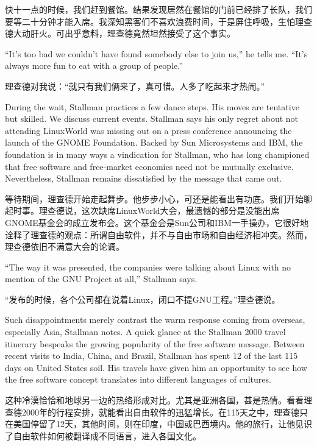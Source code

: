 \ifdefined\chs
快十一点的时候，我们赶到餐馆。结果发现居然在餐馆的门前已经排了长队，我们要等二十分钟才能入席。我深知黑客们不喜欢浪费时间，于是屏住呼吸，生怕理查德大动肝火。可出乎意料，理查德竟然坦然接受了这个事实。
\fi

\ifdefined\eng
``It's too bad we couldn't have found somebody else to join us,'' he tells me. ``It's always more fun to eat with a group of people.''
\fi

\ifdefined\chs
理查德对我说：“就只有我们俩来了，真可惜。人多了吃起来才热闹。”
\fi

\ifdefined\eng
During the wait, Stallman practices a few dance steps. His moves are tentative but skilled. We discuss current events. Stallman says his only regret about not attending LinuxWorld was missing out on a press conference announcing the launch of the GNOME Foundation. Backed by Sun Microsystems and IBM, the foundation is in many ways a vindication for Stallman, who has long championed that free software and free-market economics need not be mutually exclusive. Nevertheless, Stallman remains dissatisfied by the message that came out.
\fi

\ifdefined\chs
等待期间，理查德开始走起舞步。他步步小心，可还是能看出有功底。我们开始聊起时事。理查德说，这次缺席LinuxWorld大会，最遗憾的部分是没能出席GNOME基金会的成立发布会。这个基金会是Sun公司和IBM一手操办，它很好地诠释了理查德的观点：所谓自由软件，并不与自由市场和自由经济相冲突。然而，理查德依旧不满意大会的论调。
\fi

\ifdefined\eng
``The way it was presented, the companies were talking about Linux with no mention of the GNU Project at all,'' Stallman says.
\fi

\ifdefined\chs
“发布的时候，各个公司都在说着Linux，闭口不提GNU工程。”理查德说。
\fi

\ifdefined\eng
Such disappointments merely contrast the warm response coming from overseas, especially Asia, Stallman notes. A quick glance at the Stallman 2000 travel itinerary bespeaks the growing popularity of the free software message. Between recent visits to India, China, and Brazil, Stallman has spent 12 of the last 115 days on United States soil. His travels have given him an opportunity to see how the free software concept translates into different languages of cultures.
\fi

\ifdefined\chs
这种冷漠恰恰和地球另一边的热络形成对比。尤其是亚洲各国，甚是热情。看看理查德2000年的行程安排，就能看出自由软件的迅猛增长。在115天之中，理查德只在美国停留了12天，其他时间，则在印度，中国或巴西境内。他的旅行，让他见识了自由软件如何被翻译成不同语言，进入各国文化。
\fi

